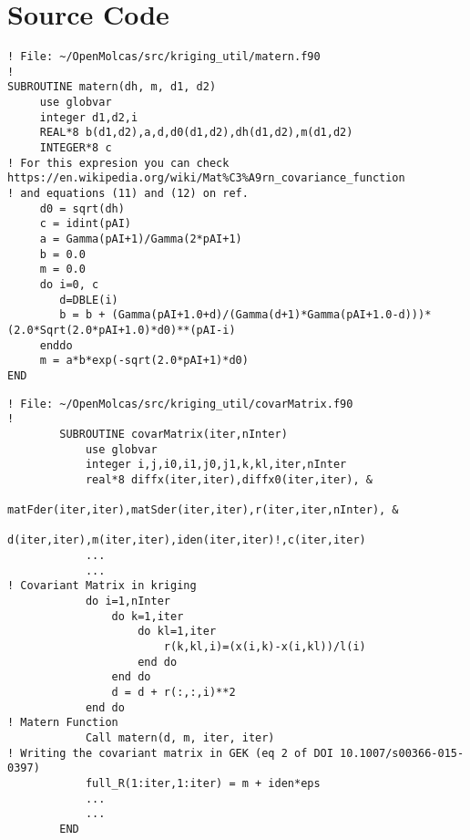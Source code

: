 \documentclass[aps,prb,twocolumn,superscriptaddress,floatfix,longbibliography,10pt]{revtex4-2}
\begin{document}
\vspace{50mm}



\appendix

\section{Source Code}

\begin{lstlisting}[caption={(Code: 1)}, title={Code: 1. Mat\'ern Function}, label=code.matern]
! File: ~/OpenMolcas/src/kriging_util/matern.f90
!
SUBROUTINE matern(dh, m, d1, d2)
     use globvar
     integer d1,d2,i
     REAL*8 b(d1,d2),a,d,d0(d1,d2),dh(d1,d2),m(d1,d2)
     INTEGER*8 c
! For this expresion you can check https://en.wikipedia.org/wiki/Mat%C3%A9rn_covariance_function
! and equations (11) and (12) on ref.
     d0 = sqrt(dh)
     c = idint(pAI)
     a = Gamma(pAI+1)/Gamma(2*pAI+1)
     b = 0.0
     m = 0.0
     do i=0, c
        d=DBLE(i)
        b = b + (Gamma(pAI+1.0+d)/(Gamma(d+1)*Gamma(pAI+1.0-d)))*(2.0*Sqrt(2.0*pAI+1.0)*d0)**(pAI-i)
     enddo
     m = a*b*exp(-sqrt(2.0*pAI+1)*d0)
END
\end{lstlisting}

\begin{lstlisting}[caption={(Code: 2)}, title={Code: 2. Defining matrix d and r for the covariant matrix}, label=code.CMdr]
! File: ~/OpenMolcas/src/kriging_util/covarMatrix.f90
!
		SUBROUTINE covarMatrix(iter,nInter)
            use globvar
            integer i,j,i0,i1,j0,j1,k,kl,iter,nInter
            real*8 diffx(iter,iter),diffx0(iter,iter), &
                    matFder(iter,iter),matSder(iter,iter),r(iter,iter,nInter), &
                    d(iter,iter),m(iter,iter),iden(iter,iter)!,c(iter,iter)
            ...
            ...
! Covariant Matrix in kriging
            do i=1,nInter
                do k=1,iter
                    do kl=1,iter
                        r(k,kl,i)=(x(i,k)-x(i,kl))/l(i)
                    end do
                end do
                d = d + r(:,:,i)**2
            end do
! Matern Function
            Call matern(d, m, iter, iter)
! Writing the covariant matrix in GEK (eq 2 of DOI 10.1007/s00366-015-0397)
            full_R(1:iter,1:iter) = m + iden*eps
    		...
    		...
        END
\end{lstlisting}
\end{document}
